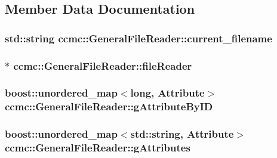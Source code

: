 \subsection{Member Data Documentation}
\hypertarget{classccmc_1_1_general_file_reader_a5ccab7d8bd4672ee5d6210288d5f41bd}{
\subsubsection[{current\-\_\-filename}]{\setlength{\rightskip}{0pt plus 5cm}std\-::string ccmc\-::\-General\-File\-Reader\-::current\-\_\-filename\hspace{0.3cm}{\ttfamily [protected]}}}\label{classccmc_1_1_general_file_reader_a5ccab7d8bd4672ee5d6210288d5f41bd}
\hypertarget{classccmc_1_1_general_file_reader_a255d7c592bd3908186af70794f05c0ea}{
\subsubsection[{file\-Reader}]{$\ast$ ccmc\-::\-General\-File\-Reader\-::file\-Reader\hspace{0.3cm}{\ttfamily [protected]}}}\label{classccmc_1_1_general_file_reader_a255d7c592bd3908186af70794f05c0ea}
\hypertarget{classccmc_1_1_general_file_reader_a395e6335be8a0c569489a9635f6b9252}{
\subsubsection[{g\-Attribute\-By\-I\-D}]{\setlength{\rightskip}{0pt plus 5cm}boost\-::unordered\-\_\-map$<$long, {\bf Attribute}$>$ ccmc\-::\-General\-File\-Reader\-::g\-Attribute\-By\-I\-D\hspace{0.3cm}{\ttfamily [protected]}}}\label{classccmc_1_1_general_file_reader_a395e6335be8a0c569489a9635f6b9252}
\hypertarget{classccmc_1_1_general_file_reader_ae5d6c9e0cebe12ce9564b99f1175f319}{
\subsubsection[{g\-Attributes}]{\setlength{\rightskip}{0pt plus 5cm}boost\-::unordered\-\_\-map$<$std\-::string, {\bf Attribute}$>$ ccmc\-::\-General\-File\-Reader\-::g\-Attributes\hspace{0.3cm}{\ttfamily [protected]}}}\label{classccmc_1_1_general_file_reader_ae5d6c9e0cebe12ce9564b99f1175f319}
